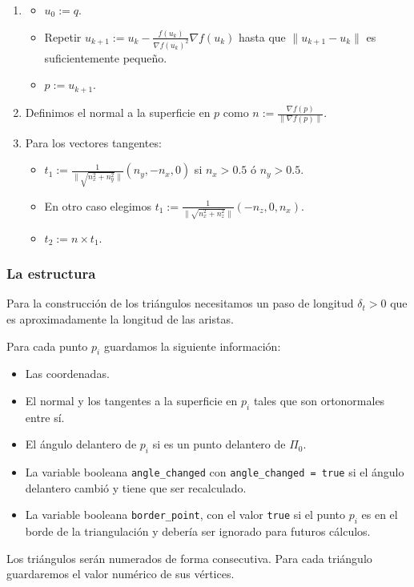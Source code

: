 \begin{enumerate}
	\item
\begin{itemize}
	\item $u_0 := q$.
	\item Repetir $u_{k+1} := u_k - \frac{f(u_k)}{\nabla f(u_k)^2} \nabla f(u_k)$ hasta que $\| u_{k+1} - u_k \|$ es suficientemente pequeño.
	\item $p := u_{k+1}$.
\end{itemize}
	
	\item Definimos el normal a la superficie en $p$ como $n := \frac{\nabla f(p)}{\| \nabla f(p) \|}$.
	
	\item Para los vectores tangentes:
\begin{itemize}
	\item $t_1 := \frac{1}{\| \sqrt{n_x^2 + n_y^2} \|} (n_y, -n_x, 0)$ si $n_x > 0.5$ ó $n_y > 0.5$.
	\item En otro caso elegimos $t_1 := \frac{1}{\| \sqrt{n_x^2 + n_z^2} \|} (-n_z, 0, n_x)$.
	\item $t_2 := n \times t_1$.
\end{itemize}
\end{enumerate}

\subsubsection{La estructura}

Para la construcción de los triángulos necesitamos un paso de longitud $\delta_t > 0$ que es aproximadamente la longitud de las aristas.

Para cada punto $p_i$ guardamos la siguiente información:
\begin{itemize}
	\item Las coordenadas.
	\item El normal y los tangentes a la superficie en $p_i$ tales que son ortonormales entre sí.
	\item El ángulo delantero de $p_i$ si es un punto delantero de $\Pi_0$.
	\item La variable booleana \texttt{angle\_changed} con \texttt{angle\_changed = true} si el ángulo delantero cambió y tiene que ser recalculado.
	\item La variable booleana \texttt{border\_point}, con el valor \texttt{true} si el punto $p_i$ es en el borde de la triangulación y debería ser ignorado para futuros cálculos.
\end{itemize}
Los triángulos serán numerados de forma consecutiva. Para cada triángulo guardaremos el valor numérico de sus vértices.

